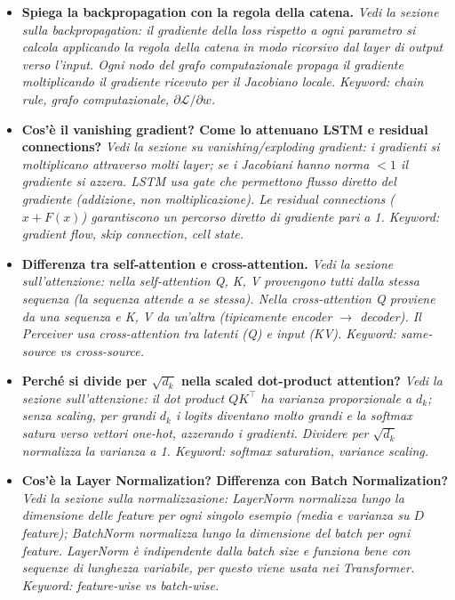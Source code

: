 \documentclass[
  11pt,
]{article}
\begin{document}
\begin{itemize}

  \item \textbf{Spiega la backpropagation con la regola della catena.}
  \textit{Vedi la sezione sulla backpropagation: il gradiente della loss rispetto a ogni parametro si calcola applicando la regola della catena in modo ricorsivo dal layer di output verso l'input. Ogni nodo del grafo computazionale propaga il gradiente moltiplicando il gradiente ricevuto per il Jacobiano locale. Keyword: chain rule, grafo computazionale, $\partial \mathcal{L}/\partial w$.}

  \item \textbf{Cos'è il vanishing gradient? Come lo attenuano LSTM e residual connections?}
  \textit{Vedi la sezione su vanishing/exploding gradient: i gradienti si moltiplicano attraverso molti layer; se i Jacobiani hanno norma $<1$ il gradiente si azzera. LSTM usa gate che permettono flusso diretto del gradiente (addizione, non moltiplicazione). Le residual connections ($x + F(x)$) garantiscono un percorso diretto di gradiente pari a 1. Keyword: gradient flow, skip connection, cell state.}

  \item \textbf{Differenza tra self-attention e cross-attention.}
  \textit{Vedi la sezione sull'attenzione: nella self-attention Q, K, V provengono tutti dalla stessa sequenza (la sequenza attende a se stessa). Nella cross-attention Q proviene da una sequenza e K, V da un'altra (tipicamente encoder $\to$ decoder). Il Perceiver usa cross-attention tra latenti (Q) e input (KV). Keyword: same-source vs cross-source.}

  \item \textbf{Perché si divide per $\sqrt{d_k}$ nella scaled dot-product attention?}
  \textit{Vedi la sezione sull'attenzione: il dot product $QK^\top$ ha varianza proporzionale a $d_k$; senza scaling, per grandi $d_k$ i logits diventano molto grandi e la softmax satura verso vettori one-hot, azzerando i gradienti. Dividere per $\sqrt{d_k}$ normalizza la varianza a 1. Keyword: softmax saturation, variance scaling.}

  \item \textbf{Cos'è la Layer Normalization? Differenza con Batch Normalization?}
  \textit{Vedi la sezione sulla normalizzazione: LayerNorm normalizza \emph{lungo la dimensione delle feature} per ogni singolo esempio (media e varianza su $D$ feature); BatchNorm normalizza \emph{lungo la dimensione del batch} per ogni feature. LayerNorm è indipendente dalla batch size e funziona bene con sequenze di lunghezza variabile, per questo viene usata nei Transformer. Keyword: feature-wise vs batch-wise.}


\end{itemize}
\end{document}
